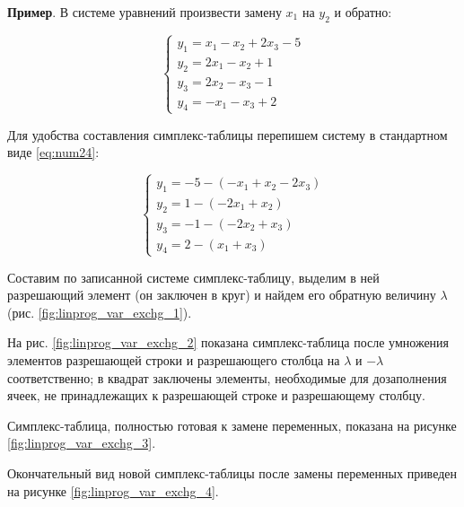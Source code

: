 \documentclass[a4paper,12pt]{report}
\begin{document}
\textbf{Пример}. В системе уравнений произвести замену $x_{1}$ на $y_{2}$ и обратно:

\begin{equation*}
\begin{cases}
y_{1} = x_{1} - x_{2} + 2x_{3} - 5\\
y_{2} = 2x_{1} - x_{2} + 1\\
y_{3} = 2x_{2} - x_{3} - 1\\
y_{4} = -x_{1} - x_{3} + 2
\end{cases}	
\end{equation*}

Для удобства составления симплекс-таблицы перепишем систему в стандартном виде \eqref{eq:num24}:

\begin{equation*}
\begin{cases}
y_{1} = - 5 - (-x_{1} + x_{2} - 2x_{3})\\
y_{2} = 1 - (-2x_{1} + x_{2})\\
y_{3} = - 1 - (-2x_{2} + x_{3})\\
y_{4} = 2 - (x_{1} + x_{3})
\end{cases}	
\end{equation*}

Составим по записанной системе симплекс-таблицу, выделим в ней разрешающий элемент (он заключен в круг) и найдем его обратную величину $\lambda$ (рис. \ref{fig:linprog_var_exchg_1}).

На рис. \ref{fig:linprog_var_exchg_2} показана симплекс-таблица после умножения элементов разрешающей строки и разрешающего столбца на $\lambda$ и $-\lambda$ соответственно; в квадрат заключены элементы, необходимые для дозаполнения ячеек, не принадлежащих к разрешающей строке и разрешающему столбцу.

Симплекс-таблица, полностью готовая к замене переменных, показана на рисунке \ref{fig:linprog_var_exchg_3}.

Окончательный вид новой симплекс-таблицы после замены переменных приведен на рисунке \ref{fig:linprog_var_exchg_4}.
\end{document}
